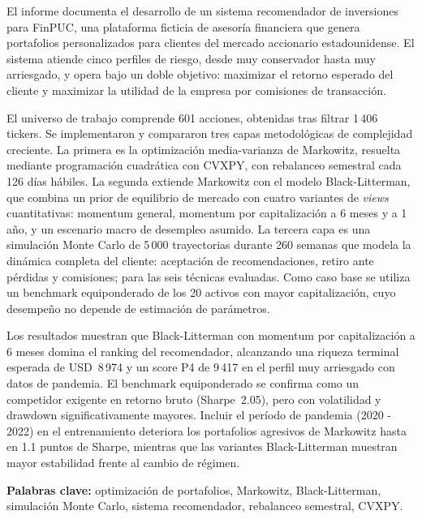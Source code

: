 El informe documenta el desarrollo
de un sistema
recomendador de inversiones para FinPUC, una plataforma ficticia de asesor\'ia
financiera que genera portafolios personalizados para clientes del mercado
accionario estadounidense. El sistema atiende cinco perfiles de riesgo, desde
muy conservador hasta muy arriesgado, y opera bajo un doble objetivo:
maximizar el retorno esperado del cliente y maximizar la utilidad de la empresa
por comisiones de transacci\'on.

El universo de trabajo comprende 601 acciones, obtenidas tras filtrar 1\,406
tickers. Se implementaron y compararon tres capas
metodol\'ogicas de complejidad creciente. La primera es la optimizaci\'on
media-varianza de Markowitz, resuelta mediante programaci\'on cuadr\'atica con
CVXPY, con rebalanceo semestral cada 126 d\'ias h\'abiles. La segunda extiende
Markowitz con el modelo Black-Litterman, que combina un prior de equilibrio de
mercado con cuatro variantes de \textit{views} cuantitativas: momentum general,
momentum por capitalizaci\'on a 6 meses y a 1 a\~no, y un escenario macro de
desempleo asumido. La tercera capa es una simulaci\'on Monte Carlo de 5\,000
trayectorias durante 260 semanas que modela la din\'amica completa del cliente: aceptaci\'on de recomendaciones, retiro ante p\'erdidas y comisiones; para
las seis t\'ecnicas evaluadas. Como caso base se utiliza un benchmark
equiponderado de los 20 activos con mayor capitalizaci\'on, cuyo desempe\~no no
depende de estimaci\'on de par\'ametros.

Los resultados muestran que Black-Litterman con momentum por
capitalizaci\'on a 6 meses domina el ranking del recomendador, alcanzando una
riqueza terminal esperada de USD~8\,974 y un score P4 de 9\,417 en el perfil
muy arriesgado con datos de pandemia. El benchmark equiponderado se confirma
como un competidor exigente en retorno bruto (Sharpe~2.05), pero con
volatilidad y drawdown significativamente mayores. Incluir el per\'iodo de
pandemia (2020 - 2022) en el entrenamiento deteriora los portafolios agresivos
de Markowitz hasta en 1.1 puntos de Sharpe, mientras que las variantes
Black-Litterman muestran mayor estabilidad frente al cambio de r\'egimen.

\textbf{Palabras clave:} optimizaci\'on de portafolios, Markowitz,
Black-Litterman, simulaci\'on Monte Carlo, sistema recomendador, rebalanceo
semestral, CVXPY.